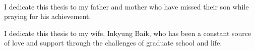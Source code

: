 \begin{center}
\\
\end{center}
\vspace*{\fill}
\begin{center}
\noindent I dedicate this thesis to my father and mother who have missed their son while praying for his achievement.
\end{center}
\begin{center}
\noindent I dedicate this thesis to my wife, Inkyung Baik, who has been a constant source of love and support through the challenges of graduate school and life.
\end{center}
\vspace*{\fill}
